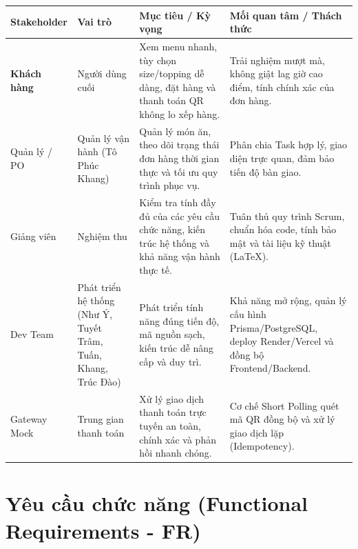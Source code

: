 \small
\begin{tabularx}{\textwidth}{
@{}>{\RaggedRight\arraybackslash\bfseries}p{2.3cm}
>{\RaggedRight\arraybackslash}p{2.6cm}
>{\RaggedRight\arraybackslash}X
>{\RaggedRight\arraybackslash}X@{}
}
\toprule
\rowcolor{tableblue}
Stakeholder & Vai trò & Mục tiêu / Kỳ vọng &
Mối quan tâm / Thách thức \\
\midrule

Khách hàng &
Người dùng cuối &
Xem menu nhanh, tùy chọn size/topping dễ dàng,
đặt hàng và thanh toán QR không lo xếp hàng. &
Trải nghiệm mượt mà, không giật lag giờ cao điểm,
tính chính xác của đơn hàng. \\

\midrule

Quản lý / PO &
Quản lý vận hành (Tô Phúc Khang) &
Quản lý món ăn, theo dõi trạng thái đơn hàng
thời gian thực và tối ưu quy trình phục vụ. &
Phân chia Task hợp lý, giao diện trực quan, 
đảm bảo tiến độ bàn giao. \\

\midrule

Giảng viên &
Nghiệm thu &
Kiểm tra tính đầy đủ của các yêu cầu chức năng,
kiến trúc hệ thống và khả năng vận hành thực tế. &
Tuân thủ quy trình Scrum, chuẩn hóa code,
tính bảo mật và tài liệu kỹ thuật (LaTeX). \\

\midrule

Dev Team &
Phát triển hệ thống (Như Ý, Tuyết Trâm, Tuấn, Khang, Trúc Đào) &
Phát triển tính năng đúng tiến độ, mã nguồn sạch,
kiến trúc dễ nâng cấp và duy trì. &
Khả năng mở rộng, quản lý cấu hình Prisma/PostgreSQL, 
deploy Render/Vercel và đồng bộ Frontend/Backend. \\

\midrule

Gateway Mock &
Trung gian thanh toán &
Xử lý giao dịch thanh toán trực tuyến an toàn,
chính xác và phản hồi nhanh chóng. &
Cơ chế Short Polling quét mã QR đồng bộ 
và xử lý giao dịch lặp (Idempotency). \\

\bottomrule
\end{tabularx}
\normalsize


\section{Yêu cầu chức năng (Functional Requirements - FR)}

\vspace{12pt}

